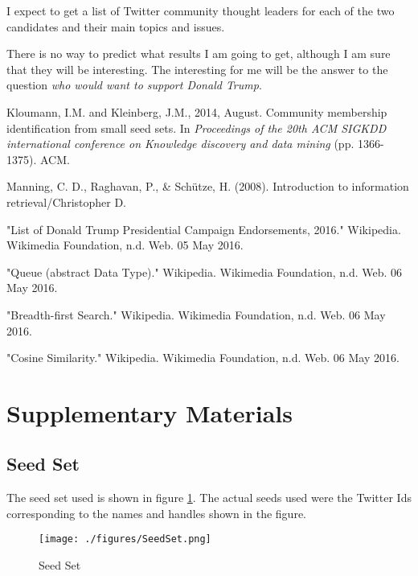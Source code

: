 \documentclass{sig-alternate-05-2015}
\begin{document}
I expect to get a list of Twitter community thought leaders for each of the two candidates and their main topics and issues.

There is no way to predict what results I am going to get, although I am sure that they will be interesting. The interesting for me will be the answer to the question \emph{who would want to support Donald Trump}. 

\begin{thebibliography}{1}

Kloumann, I.M. and Kleinberg, J.M., 2014, August. Community membership identification from small seed sets. In \emph{Proceedings of the 20th ACM SIGKDD international conference on Knowledge discovery and data mining} (pp. 1366-1375). ACM.

Manning, C. D., Raghavan, P., \& Sch\"utze, H. (2008). Introduction to information retrieval/Christopher D.

"List of Donald Trump Presidential Campaign Endorsements, 2016." Wikipedia. Wikimedia Foundation, n.d. Web. 05 May 2016.

"Queue (abstract Data Type)." Wikipedia. Wikimedia Foundation, n.d. Web. 06 May 2016.

"Breadth-first Search." Wikipedia. Wikimedia Foundation, n.d. Web. 06 May 2016.

"Cosine Similarity." Wikipedia. Wikimedia Foundation, n.d. Web. 06 May 2016.

\end{thebibliography}

\section{Supplementary Materials}
\subsection{Seed Set}
\label{sssec:num1} 
The seed set used is shown in figure \ref{SeedSetTable}. The actual seeds used were the Twitter Ids corresponding to the names and handles shown in the figure.
\begin{figure}[!t]
\centering
\texttt{[image: ./figures/SeedSet.png]}
\caption{Seed Set}
\label{SeedSetTable}
\end{figure}
%
%
%
%

\end{document}

